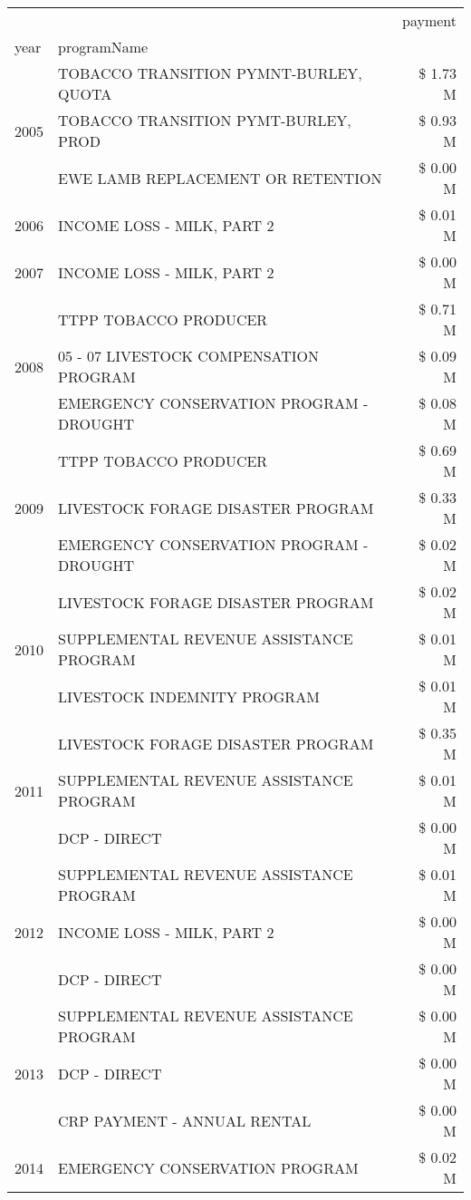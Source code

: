 \begin{tabular}{llr}
\toprule
 &  & payment \\
year & programName &  \\
\midrule
\multirow[t]{3}{*}{2005} & TOBACCO TRANSITION PYMNT-BURLEY, QUOTA & \$ 1.73 M \\
 & TOBACCO TRANSITION PYMT-BURLEY, PROD & \$ 0.93 M \\
 & EWE LAMB REPLACEMENT OR RETENTION & \$ 0.00 M \\
\cline{1-3}
2006 & INCOME LOSS - MILK, PART 2 & \$ 0.01 M \\
\cline{1-3}
2007 & INCOME LOSS - MILK, PART 2 & \$ 0.00 M \\
\cline{1-3}
\multirow[t]{3}{*}{2008} & TTPP TOBACCO PRODUCER & \$ 0.71 M \\
 & 05 - 07 LIVESTOCK COMPENSATION PROGRAM & \$ 0.09 M \\
 & EMERGENCY CONSERVATION PROGRAM - DROUGHT & \$ 0.08 M \\
\cline{1-3}
\multirow[t]{3}{*}{2009} & TTPP TOBACCO PRODUCER & \$ 0.69 M \\
 & LIVESTOCK FORAGE DISASTER  PROGRAM & \$ 0.33 M \\
 & EMERGENCY CONSERVATION PROGRAM - DROUGHT & \$ 0.02 M \\
\cline{1-3}
\multirow[t]{3}{*}{2010} & LIVESTOCK FORAGE DISASTER PROGRAM & \$ 0.02 M \\
 & SUPPLEMENTAL REVENUE ASSISTANCE PROGRAM & \$ 0.01 M \\
 & LIVESTOCK INDEMNITY PROGRAM & \$ 0.01 M \\
\cline{1-3}
\multirow[t]{3}{*}{2011} & LIVESTOCK FORAGE DISASTER PROGRAM & \$ 0.35 M \\
 & SUPPLEMENTAL REVENUE ASSISTANCE PROGRAM & \$ 0.01 M \\
 & DCP - DIRECT & \$ 0.00 M \\
\cline{1-3}
\multirow[t]{3}{*}{2012} & SUPPLEMENTAL REVENUE ASSISTANCE PROGRAM & \$ 0.01 M \\
 & INCOME LOSS - MILK, PART 2 & \$ 0.00 M \\
 & DCP - DIRECT & \$ 0.00 M \\
\cline{1-3}
\multirow[t]{3}{*}{2013} & SUPPLEMENTAL REVENUE ASSISTANCE PROGRAM & \$ 0.00 M \\
 & DCP - DIRECT & \$ 0.00 M \\
 & CRP PAYMENT - ANNUAL RENTAL & \$ 0.00 M \\
\cline{1-3}
\multirow[t]{3}{*}{2014} & EMERGENCY CONSERVATION PROGRAM & \$ 0.02 M \\

\end{tabular}
